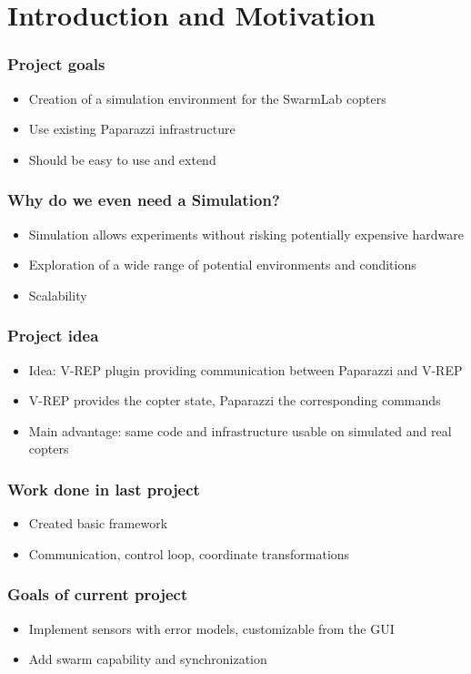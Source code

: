 \section{Introduction and Motivation}

\begin{frame}
	\frametitle{Project goals}
	\begin{itemize}
		\item Creation of a simulation environment for the SwarmLab copters
		\item Use existing Paparazzi infrastructure
		\item Should be easy to use and extend
	\end{itemize}
\end{frame}



\begin{frame}
\frametitle{Why do we even need a Simulation?}
\begin{itemize}
	\item Simulation allows experiments without risking potentially expensive hardware
	\item Exploration of a wide range of potential environments and conditions
	\item Scalability
\end{itemize}
\end{frame}

\begin{frame}
\frametitle{Project idea}
\begin{itemize}
	\item Idea: V-REP plugin providing communication between Paparazzi and V-REP
	\item V-REP provides the copter state, Paparazzi the corresponding commands
	\item Main advantage: same code and infrastructure usable on simulated and real copters
\end{itemize}
\end{frame}

\begin{frame}
	\frametitle{Work done in last project}
	\begin{itemize}
		\item Created basic framework
		\item Communication, control loop, coordinate transformations	
	\end{itemize}
\end{frame}

\begin{frame}
\frametitle{Goals of current project}
\begin{itemize}
	\item Implement sensors with error models, customizable from the GUI
	\item Add swarm capability and synchronization
\end{itemize}
\end{frame}
